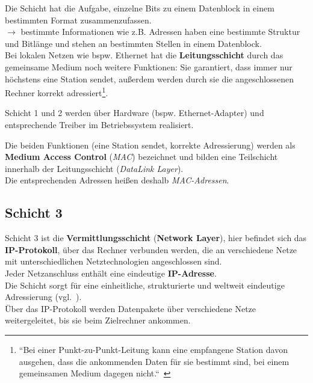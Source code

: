 \noindent
Die Schicht hat die Aufgabe, einzelne Bits zu einem Datenblock in einem bestimmten Format zusammenzufassen.\\
$\rightarrow$ bestimmte Informationen wie z.B. Adressen haben eine bestimmte Struktur und Bitlänge und stehen an bestimmten Stellen in einem Datenblock.\\

\noindent
Bei lokalen Netzen wie {bspw.} Ethernet hat die \textbf{Leitungsschicht} durch das gemeinsame Medium noch weitere Funktionen: Sie garantiert, dass immer nur höchstens eine Station sendet, außerdem werden durch sie die angeschlossenen Rechner korrekt adressiert\footnote{
``Bei einer Punkt-zu-Punkt-Leitung kann eine empfangene Station davon ausgehen, dass die ankommenden Daten für sie bestimmt sind, bei einem gemeinsamen Medium dagegen nicht.``~\cite[257]{Oec22}
}.

\begin{tcolorbox}[enlarge top by=0.5cm,enlarge bottom by=0.5cm]
    Schicht 1 und 2 werden über Hardware ({bspw.} Ethernet-Adapter) und entsprechende Treiber im Betriebssystem realisiert.
\end{tcolorbox}

\noindent
Die beiden Funktionen (eine Station sendet, korrekte Adressierung) werden als \textbf{Medium Access Control} (\textit{MAC}) bezeichnet und bilden eine Teilschicht innerhalb der Leitungsschicht (\textit{DataLink Layer}).\\
Die entsprechenden Adressen heißen deshalb \textit{MAC-Adressen}.

\subsection*{Schicht 3}
Schicht 3 ist die \textbf{Vermittlungsschicht} (\textbf{Network Layer}), hier befindet sich das \textbf{IP-Protokoll}, über das Rechner verbunden werden, die an verschiedene Netze mit unterschiedlichen Netztechnologien angeschlossen sind.\\

\noindent
Jeder Netzanschluss enthält eine eindeutige \textbf{IP-Adresse}.\\
Die Schicht sorgt für eine einheitliche, strukturierte und weltweit eindeutige Adressierung (vgl.~\cite[258]{Oec22}).\\

\noindent
Über das IP-Protokoll werden Datenpakete über verschiedene Netze weitergeleitet, bis sie beim Zielrechner ankommen.\\

